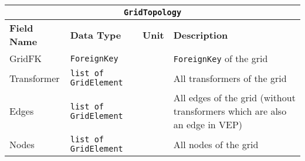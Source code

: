 \vspace{.5cm}

\begin{tabular}{ l p{3cm} l p{8cm}} 
    \hline
    \multicolumn{4}{c}{\texttt{GridTopology}}\\
    \hline
    \textbf{Field Name} & \textbf{Data Type}              & \textbf{Unit} & \textbf{Description} \\
    \hline
    GridFK              & \texttt{ForeignKey}                       &               & \texttt{ForeignKey} of the grid\\
    Transformer         & \texttt{list of GridElement}    &         & All transformers of the grid\\
    Edges               & \texttt{list of GridElement}    &         & All edges of the grid (without transformers which are also an edge in VEP)\\
    Nodes               & \texttt{list of GridElement}    &         & All nodes of the grid \\
\end{tabular}

\vspace{.5cm}

